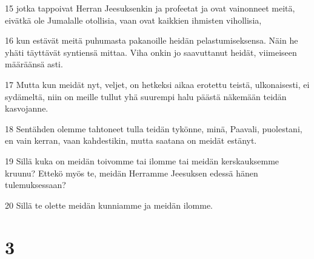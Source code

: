 \par 15 jotka tappoivat Herran Jeesuksenkin ja profeetat ja ovat vainonneet meitä, eivätkä ole Jumalalle otollisia, vaan ovat kaikkien ihmisten vihollisia,
\par 16 kun estävät meitä puhumasta pakanoille heidän pelastumiseksensa. Näin he yhäti täyttävät syntiensä mittaa. Viha onkin jo saavuttanut heidät, viimeiseen määräänsä asti.
\par 17 Mutta kun meidät nyt, veljet, on hetkeksi aikaa erotettu teistä, ulkonaisesti, ei sydämeltä, niin on meille tullut yhä suurempi halu päästä näkemään teidän kasvojanne.
\par 18 Sentähden olemme tahtoneet tulla teidän tykönne, minä, Paavali, puolestani, en vain kerran, vaan kahdestikin, mutta saatana on meidät estänyt.
\par 19 Sillä kuka on meidän toivomme tai ilomme tai meidän kerskauksemme kruunu? Ettekö myös te, meidän Herramme Jeesuksen edessä hänen tulemuksessaan?
\par 20 Sillä te olette meidän kunniamme ja meidän ilomme.

\chapter{3}

